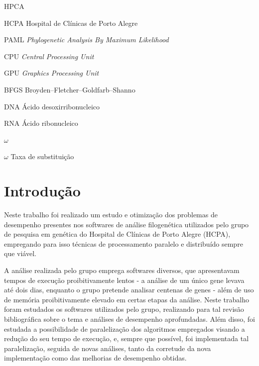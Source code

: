 \documentclass[cic,tc]{iiufrgs}
\begin{document}
\listoffigures

\listoftables

\begin{listofabbrv}{HPCA}
    \item[HCPA] Hospital de Clínicas de Porto Alegre
    \item[PAML] \textit{Phylogenetic Analysis By Maximum Likelihood}
    \item[CPU] \textit{Central Processing Unit}
    \item[GPU] \textit{Graphics Processing Unit}
    \item[BFGS] Broyden–Fletcher–Goldfarb–Shanno
    \item[DNA] Ácido desoxirribonucleico
    \item[RNA] Ácido ribonucleico
\end{listofabbrv}

\begin{listofsymbols}{$\omega$}
    \item[$\omega$] Taxa de substituição
\end{listofsymbols}

\tableofcontents


\chapter{Introdução}

Neste trabalho foi realizado um estudo e otimização dos problemas de desempenho
presentes nos softwares de análise filogenética utilizados pelo grupo de
pesquisa em genética do Hospital de Clínicas de Porto Alegre (HCPA), empregando
para isso técnicas de processamento paralelo e distribuído sempre que viável.

A análise realizada pelo grupo emprega softwares diversos, que apresentavam
tempos de execução proibitivamente lentos - a análise de um único gene levava
até dois dias, enquanto o grupo pretende analisar centenas de genes - além de
uso de memória proibitivamente elevado em certas etapas da análise. Neste
trabalho foram estudados os softwares utilizados pelo grupo, realizando para
tal revisão bibliográfica sobre o tema e análises de desempenho aprofundadas.
Além disso, foi estudada a possibilidade de paralelização dos algoritmos
empregados visando a redução do seu tempo de execução, e, sempre que possível,
foi implementada tal paralelização, seguida de novas análises, tanto da
corretude da nova implementação como das melhorias de desempenho obtidas.
\end{document}
